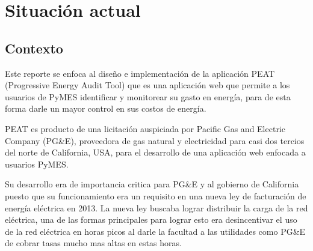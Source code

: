 \chapter{Situación actual}
\section{Contexto}
Este reporte se enfoca al diseño e implementación de la aplicación
PEAT (Progressive Energy Audit Tool) que es una aplicación web que
permite a los usuarios de PyMES identificar y monitorear su gasto en
energía, para de esta forma darle un mayor control en sus costos de
energía.

PEAT es producto de una licitación auspiciada por Pacific Gas and
Electric Company (PG\&E), proveedora de gas natural y electricidad
para casi dos tercios del norte de California, USA, para
el desarrollo de una aplicación web enfocada a usuarios PyMES.

Su desarrollo era de importancia critica para PG\&E y al gobierno de
California puesto que su funcionamiento era un requisito en una nueva
ley de facturación de energía eléctrica en 2013. La nueva ley buscaba
lograr distribuir la carga de la red eléctrica, una de las formas
principales para lograr esto era desincentivar el uso de la red
eléctrica en horas picos al darle la facultad a las utilidades como PG\&E
de cobrar tasas mucho mas altas en estas horas.
